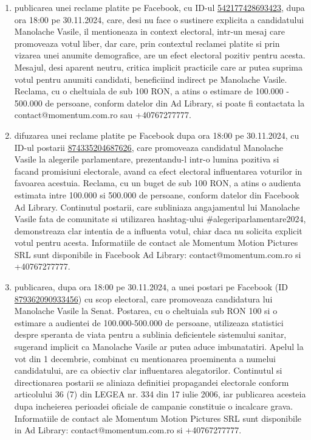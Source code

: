 \documentclass[a4paper,12pt]{article}
\begin{document}
\begin{enumerate}[leftmargin=*, label=\arabic*.)]
    \item publicarea unei reclame platite pe Facebook, cu ID-ul \href{https://www.facebook.com/ads/library/?id=542177428693423}{542177428693423}, dupa ora 18:00 pe 30.11.2024, care, desi nu face o sustinere explicita a candidatului Manolache Vasile, il mentioneaza in context electoral, intr-un mesaj care promoveaza votul liber, dar care, prin contextul reclamei platite si prin vizarea unei anumite demografice, are un efect electoral pozitiv pentru acesta.  Mesajul, desi aparent neutru, critica implicit practicile care ar putea suprima votul pentru anumiti candidati, beneficiind indirect pe Manolache Vasile.  Reclama, cu o cheltuiala de sub 100 RON, a atins o estimare de 100.000 - 500.000 de persoane, conform datelor din Ad Library, si poate fi contactata la contact@momentum.com.ro sau +40767277777.
    \item difuzarea unei reclame platite pe Facebook dupa ora 18:00 pe 30.11.2024, cu ID-ul postarii \href{https://www.facebook.com/ads/library/?id=874335204687626}{874335204687626}, care promoveaza candidatul Manolache Vasile la alegerile parlamentare, prezentandu-l intr-o lumina pozitiva si facand promisiuni electorale, avand ca efect electoral influentarea voturilor in favoarea acestuia.  Reclama, cu un buget de sub 100 RON, a atins o audienta estimata intre 100.000 si 500.000 de persoane, conform datelor din Facebook Ad Library.  Continutul postarii, care subliniaza angajamentul lui Manolache Vasile fata de comunitate si utilizarea hashtag-ului \#alegeriparlamentare2024, demonstreaza clar intentia de a influenta votul, chiar daca nu solicita explicit votul pentru acesta.  Informatiile de contact ale Momentum Motion Pictures SRL sunt disponibile in Facebook Ad Library: contact@momentum.com.ro si +40767277777.
    \item publicarea, dupa ora 18:00 pe 30.11.2024, a unei postari pe Facebook (ID \href{https://www.facebook.com/ads/library/?id=879362090933456}{879362090933456}) cu scop electoral, care promoveaza candidatura lui Manolache Vasile la Senat. Postarea, cu o cheltuiala sub RON 100 si o estimare a audientei de 100.000-500.000 de persoane, utilizeaza statistici despre speranta de viata pentru a sublinia deficientele sistemului sanitar, sugerand implicit ca Manolache Vasile ar putea aduce imbunatatiri.  Apelul la vot din 1 decembrie, combinat cu mentionarea proeminenta a numelui candidatului, are ca obiectiv clar influentarea alegatorilor.  Continutul si directionarea postarii se aliniaza definitiei propagandei electorale conform articolului 36 (7) din LEGEA nr. 334 din 17 iulie 2006, iar publicarea acesteia dupa incheierea perioadei oficiale de campanie constituie o incalcare grava.  Informatiile de contact ale Momentum Motion Pictures SRL sunt disponibile in Ad Library: contact@momentum.com.ro si +40767277777.
\end{enumerate}
\end{document}
